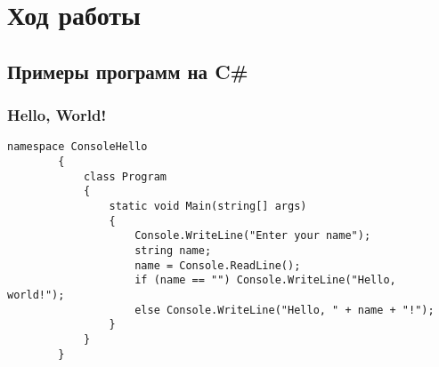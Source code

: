 \documentclass[a4paper,14pt]{extarticle}
\begin{document}
    \section{Ход работы}

    \subsection{Примеры программ на C\#}

    \subsubsection{Hello, World!}

    \begin{lstlisting}[language={[Sharp]C}]
        namespace ConsoleHello
        { 
            class Program
            {	
                static void Main(string[] args)
                { 
                    Console.WriteLine("Enter your name"); 
                    string name;
                    name = Console.ReadLine();
                    if (name == "") Console.WriteLine("Hello, world!"); 
                    else Console.WriteLine("Hello, " + name + "!");
                }
            }
        }
    \end{lstlisting}
\end{document}
